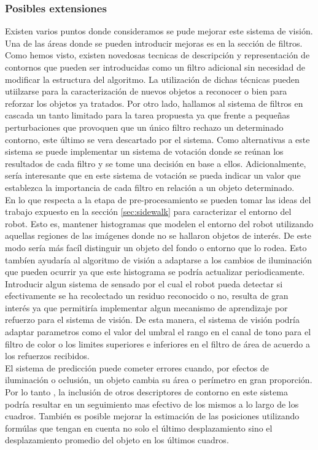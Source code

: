 \subsubsection{Posibles extensiones}
Existen varios puntos donde consideramos se pude mejorar este sistema 
de visión. Una de las áreas donde se pueden introducir mejoras es en 
la sección de filtros. Como hemos visto, existen novedosas tecnicas de 
descripción y representación de contornos que pueden ser introducidas 
como un filtro adicional sin necesidad de modificar la estructura del 
algoritmo. La utilización de dichas técnicas pueden utiilzarse para 
la caracterización de nuevos objetos a reconocer o bien para reforzar 
los objetos ya tratados. Por otro lado, hallamos al sistema de filtros 
en cascada un tanto limitado para la tarea propuesta ya que frente a 
pequeñas perturbaciones que provoquen que un único filtro rechazo un 
determinado contorno, este último se vera descartado por el sistema. 
Como alternativas a este sistema se puede implementar un sistema de 
votación donde se reúnan los resultados de cada filtro y se tome una 
decisión en base a ellos. Adicionalmente, sería interesante que en 
este sistema de votación se pueda indicar un valor que establezca la 
importancia de cada filtro en relación a un objeto determinado. \\
\indent En lo que respecta a la etapa de pre-procesamiento se pueden 
tomar las ideas del trabajo expuesto en la sección \ref{sec:sidewalk} 
para caracterizar el entorno del robot. Esto es, mantener histogramas 
que modelen el entorno del robot utilizando aquellas regiones de las 
imágenes donde no se hallaron  objetos de interés. De este modo sería más facíl 
distinguir un objeto del fondo o entorno que lo rodea. Esto tambíen 
ayudaría al algoritmo de visión a adaptarse a los cambios de 
iluminación que pueden ocurrir ya que este histograma se podría 
actualizar periodicamente.\\
\indent Introducir algun sistema de sensado por el cual el robot pueda 
detectar si efectivamente se ha recolectado un residuo reconocido o no, resulta de 
gran interés ya que permitiría implementar algun mecanismo de 
aprendizaje por refuerzo para el sistema de visión. De esta manera, el 
sistema de visión podría adaptar parametros como el valor del umbral 
el rango en el canal de tono para el filtro de color o los limites 
superiores e inferiores en el filtro de área de acuerdo a los 
refuerzos recibidos.\\
\indent El sistema de predicción puede cometer errores cuando, por 
efectos de iluminación o oclusión, un objeto cambia su área o 
perímetro en gran proporción. Por lo tanto , la inclusión de otros 
descriptores de contorno en este sistema podría resultar en un 
seguimiento mas efectivo de los mismos a lo largo de los cuadros. 
También es posible mejorar la estimación de las posiciones utilizando 
formúlas que tengan en cuenta no solo el último desplazamiento sino 
el desplazamiento promedio del objeto en los últimos cuadros.


